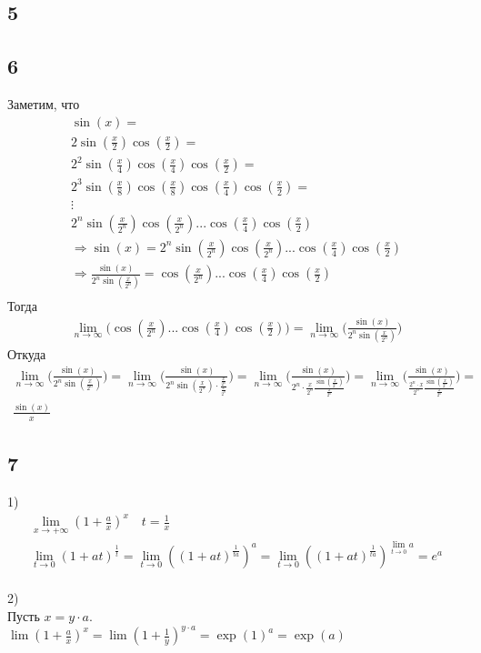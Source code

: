 		\subsection{5}
		
		\subsection{6}
		Заметим, что
		\begin{gather*}
			\sin(x) = \\
			2 \sin (\frac{x}{2}) \cos (\frac{x}{2}) = \\
			2^2 \sin (\frac{x}{4}) \cos (\frac{x}{4}) \cos (\frac{x}{2}) = \\
			2^3 \sin (\frac{x}{8}) \cos (\frac{x}{8}) \cos (\frac{x}{4}) \cos (\frac{x}{2}) = \\
			\vdots \\
			2^n \sin (\frac{x}{2^n}) \cos (\frac{x}{2^n}) ... \cos (\frac{x}{4}) \cos (\frac{x}{2})\\
			\Rightarrow
			\sin(x) = 2^n \sin (\frac{x}{2^n}) \cos (\frac{x}{2^n}) ... \cos (\frac{x}{4}) \cos (\frac{x}{2})\\
			\Rightarrow
			\frac{\sin(x)}{2^n \sin (\frac{x}{2^n})} = \cos (\frac{x}{2^n}) ... \cos (\frac{x}{4}) \cos (\frac{x}{2})\\
		\end{gather*}
		Тогда
		\begin{gather*}
		\lim_{n \to \infty} \biggl( \cos (\frac{x}{2^n}) ... \cos (\frac{x}{4}) \cos (\frac{x}{2}) \biggl) = 
		\lim_{n \to \infty} \biggl( \frac{\sin(x)}{2^n \sin (\frac{x}{2^n})} \biggl)
		\end{gather*}
		Откуда
		\begin{gather*}
			\lim_{n \to \infty} \biggl( \frac{\sin(x)}{2^n \sin (\frac{x}{2^n})} \biggl) = 
			\lim_{n \to \infty} \biggl( \frac{\sin(x)}{2^n \sin (\frac{x}{2^n}) \cdot \frac{\frac{x}{2^n}}{\frac{x}{2^n}}} \biggl) =
			\lim_{n \to \infty} \biggl( \frac{\sin(x)}{2^n \cdot \frac{x}{2^n} \frac{\sin (\frac{x}{2^n})}{\frac{x}{2^n}}} \biggl) =
			\lim_{n \to \infty} \biggl( \frac{\sin(x)}{\frac{2^n \cdot x}{2^n} \frac{\sin (\frac{x}{2^n})}{\frac{x}{2^n}}} \biggl) = \\
			\frac{\sin(x)}{x}
		\end{gather*}
		\subsection{7}
		1)\\
		\begin{gather*}
		\lim_{x \to +\infty} (1 + \frac{a}{x})^x \quad t = \frac{1}{x}\\
		\lim_{t \to 0} (1 + at)^{\frac{1}{t}} = \lim_{t \to 0} ((1 + at)^{\frac{1}{ta}})^{a} = \lim_{t \to 0} ((1 + at)^{\frac{1}{ta}})^{\lim_{t \to 0} a} = e^a 
		\end{gather*}
		\\
		2)\\
		Пусть $x = y \cdot a$.\\
		$\lim (1 + \frac{a}{x})^x = \lim (1 + \frac{1}{y})^{y \cdot a} = \exp(1)^a = \exp(a)$
		
